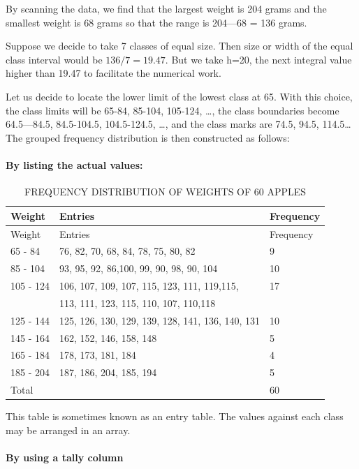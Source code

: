 \documentclass[]{article}
\let\oldparagraph\paragraph
\renewcommand{\paragraph}[1]{\oldparagraph{#1}\mbox{}}
\begin{document}
By scanning the data, we find that the largest weight is 204 grams and
the smallest weight is 68 grams so that the range is 204---68 = 136
grams.

Suppose we decide to take 7 classes of equal size. Then size or width of
the equal class interval would be \(136/7 = 19.47\). But we take h=20,
the next integral value higher than 19.47 to facilitate the numerical
work.

Let us decide to locate the lower limit of the lowest class at 65. With
this choice, the class limits will be 65-84, 85-104, 105-124, \ldots,
the class boundaries become 64.5---84.5, 84.5-104.5, 104.5-124.5,
\ldots, and the class marks are 74.5, 94.5, 114.5\ldots{} The grouped
frequency distribution is then constructed as follows:

\hypertarget{by-listing-the-actual-values}{%
\paragraph{By listing the actual
values:}\label{by-listing-the-actual-values}}

\begin{longtable}[]{@{}lll@{}}
\caption{FREQUENCY DISTRIBUTION OF WEIGHTS OF 60 APPLES}\tabularnewline
\toprule
Weight & Entries & Frequency\tabularnewline
\midrule
\endfirsthead
\toprule
Weight & Entries & Frequency\tabularnewline
\midrule
\endhead
65 - 84 & 76, 82, 70, 68, 84, 78, 75, 80, 82 & 9\tabularnewline
85 - 104 & 93, 95, 92, 86,100, 99, 90, 98, 90, 104 & 10\tabularnewline
105 - 124 & 106, 107, 109, 107, 115, 123, 111, 119,115, &
17\tabularnewline
& 113, 111, 123, 115, 110, 107, 110,118 &\tabularnewline
125 - 144 & 125, 126, 130, 129, 139, 128, 141, 136, 140, 131 &
10\tabularnewline
145 - 164 & 162, 152, 146, 158, 148 & 5\tabularnewline
165 - 184 & 178, 173, 181, 184 & 4\tabularnewline
185 - 204 & 187, 186, 204, 185, 194 & 5\tabularnewline
Total & & 60\tabularnewline
\bottomrule
\end{longtable}

This table is sometimes known as an entry table. The values against each
class may be arranged in an array.

\hypertarget{by-using-a-tally-column}{%
\paragraph{By using a tally column}\label{by-using-a-tally-column}}
\end{document}
